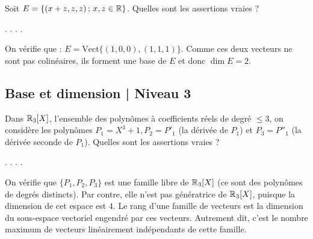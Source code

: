 \begin{question}
Soit $E=\{(x+z,z,z) \,  ; \, x,z \in \mathbb{R}\}$. 
Quelles sont les assertions vraies ?
\begin{answers}  
.
.
.
.
\end{answers}
\begin{explanations} On vérifie que : $E= \mbox {Vect}\{(1,0,0), (1,1,1)\}$. Comme ces deux vecteurs ne sont pas colinéaires, ils forment une base de $E$ et donc $\dim E = 2$.
\end{explanations}
\end{question}

\subsection{Base et dimension | Niveau 3}


\begin{question}
Dans $\mathbb{R}_3[X]$, l'ensemble des polynômes à coefficients réels de degré $\le 3$, on considère les polynômes $P_1= X^3+1, P_2= P'_1 $ (la dérivée de $P_1$) et  $ P_3 = P''_1$ (la dérivée seconde  de $P_1$). Quelles sont les assertions vraies ?
\begin{answers}  
.
.
.
.
\end{answers}
\begin{explanations}  On vérifie que $\{P_1,P_2,P_3 \}$ est une famille libre de $\mathbb{R}_3[X]$ (ce sont des polynômes de degrés 
distincts). Par contre, elle n'est pas génératrice de $\mathbb{R}_3[X]$, puisque la dimension de cet espace est $4$.
\vskip2mm
Le rang d'une famille de vecteurs est la dimension du sous-espace vectoriel engendré par ces vecteurs. Autrement dit, c'est le nombre maximum de vecteurs linéairement indépendants de cette famille.
\end{explanations}
\end{question}

